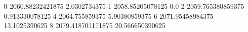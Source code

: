 0 2060.88232421875 2.0302734375
1 2058.85205078125 0.0
2 2059.765380859375 0.913330078125
4 2064.755859375 5.90380859375
6 2071.95458984375 13.1025390625
8 2079.418701171875 20.566650390625
